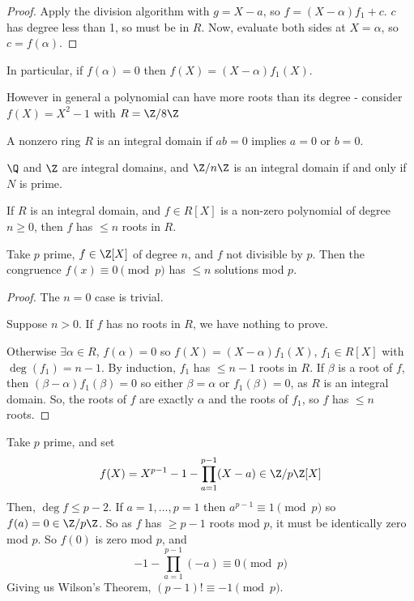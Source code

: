 \documentclass{article}
\begin{document}
\begin{proof}
    Apply the division algorithm with $g=X-a$, so $f = (X-\alpha) f_1 + c$.
    $c$ has degree less than 1, so must be in $R$.
    Now, evaluate both sides at $X = \alpha$, so $c = f(\alpha)$.
\end{proof}

In particular, if $f(\alpha) = 0$ then $f(X) = (X - \alpha) f_1(X)$.

However in general a polynomial can have more roots than its degree - consider $f(X) = X^2 - 1$ with $R = \Z / 8\Z$

\begin{defi}
    A nonzero ring $R$ is an integral domain if $ab=0$ implies $a=0$ or $b=0$.
\end{defi}

\begin{eg}
    $\Q$ and $\Z$ are integral domains, and $\Z/n\Z$ is an integral domain if and only if $N$ is prime.
\end{eg}

\begin{nthm}\label{thm:2.7}
    If $R$ is an integral domain, and $f \in R[X]$ is a non-zero polynomial of degree $n \geq 0$, then $f$ has $\leq n$ roots in $R$.
\end{nthm}

\begin{cor}
    Take $p$ prime, $f \in \Z[X]$ of degree $n$, and $f$ not divisible by $p$.
    Then the congruence $f(x) \equiv 0 \pmod{p}$ has $\leq n$ solutions mod $p$.
\end{cor}

\begin{proof}
    The $n=0$ case is trivial.

    Suppose $n > 0$. If $f$ has no roots in $R$, we have nothing to prove.

    Otherwise $\exists \alpha \in R$, $f(\alpha) = 0$ so $f(X) = (X - \alpha) f_1(X)$, $f_1 \in R[X]$ with $\deg(f_1) = n-1$.
    By induction, $f_1$ has $\leq n-1$ roots in $R$.
    If $\beta$ is a root of $f$, then $(\beta-\alpha) f_1(\beta) = 0$ so either $\beta = \alpha$ or $f_1(\beta) = 0$, as $R$ is an integral domain.
    So, the roots of $f$ are exactly $\alpha$ and the roots of $f_1$, so $f$ has $\leq n$ roots.
\end{proof}

\begin{eg}
    Take $p$ prime, and set
    \begin{equation*}f(X) = X^{p-1} - 1 - \prod_{a=1}^{p-1} (X - a) \in \Z / p \Z [X]\end{equation*}
    Then, $\deg f \leq p-2$. If $a=1, \dotsc, p=1$ then $a^{p-1} \equiv 1 \pmod{p}$ so $f(a) = 0 \in \Z/p\Z$.
    So as $f$ has $\geq p-1$ roots mod $p$, it must be identically zero mod $p$. So $f(0)$ is zero mod $p$, and
    \begin{equation*}
        -1 - \prod_{a=1}^{p-1} (-a) \equiv 0 \pmod{p}
    \end{equation*}
    Giving us Wilson's Theorem, $(p-1)! \equiv -1 \pmod{p}$.
\end{eg}
\end{document}
